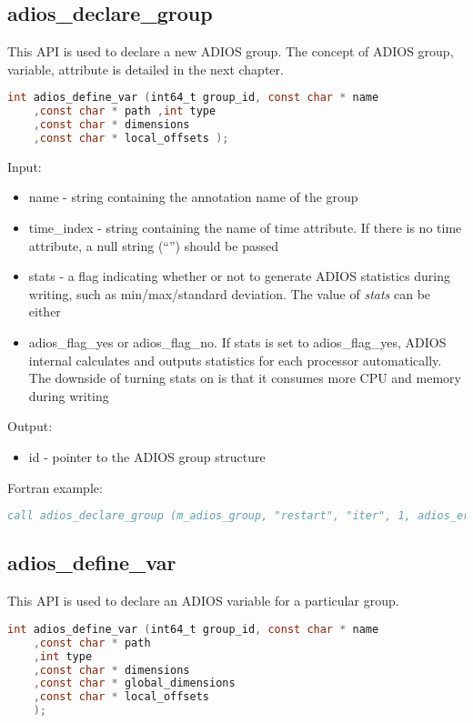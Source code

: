 \subsection{adios\_declare\_group}

This API is used to declare a new ADIOS group. The concept of ADIOS group, variable, 
attribute is detailed in the next chapter.

\begin{lstlisting}[language=C,caption={},label={}]
int adios_define_var (int64_t group_id, const char * name
	,const char * path ,int type
	,const char * dimensions
	,const char * local_offsets );
\end{lstlisting}

Input: 

\begin{itemize}
\item name - string containing the annotation name of the group 

\item time\_index - string containing the name of time attribute. If there is no time 
attribute, a null string (``'') should be passed

\item stats - a flag indicating whether or not to generate ADIOS statistics during writing, 
such as min/max/standard deviation. The value of \textit{stats} can be either \item adios\_flag\_yes{\Large  
}or adios\_flag\_no. If stats is set to adios\_flag\_yes, ADIOS internal calculates 
and outputs statistics for each processor automatically. The downside of turning 
stats on is that it consumes more CPU and memory during writing
\end{itemize}

Output: 
\begin{itemize}
\item id - pointer to the ADIOS group structure
\end{itemize}

Fortran example: 
\begin{lstlisting}[language=Fortran,caption={},label={}]
call adios_declare_group (m_adios_group, "restart", "iter", 1, adios_err)
\end{lstlisting}

\subsection{adios\_define\_var}

This API is used to declare an ADIOS variable for a particular group. 
\begin{lstlisting}[language=C,caption={},label={}]
int adios_define_var (int64_t group_id, const char * name
	,const char * path 
	,int type
	,const char * dimensions
	,const char * global_dimensions
	,const char * local_offsets 
	);
\end{lstlisting}

